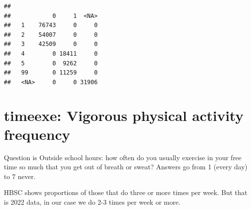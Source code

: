 \documentclass[
]{article}
\newenvironment{Shaded}{\begin{snugshade}}{\end{snugshade}}
\newcommand{\AttributeTok}[1]{\textcolor[rgb]{0.13,0.29,0.53}{#1}}
\newcommand{\DecValTok}[1]{\textcolor[rgb]{0.00,0.00,0.81}{#1}}
\newcommand{\FunctionTok}[1]{\textcolor[rgb]{0.13,0.29,0.53}{\textbf{#1}}}
\newcommand{\NormalTok}[1]{#1}
\newcommand{\OtherTok}[1]{\textcolor[rgb]{0.56,0.35,0.01}{#1}}
\newcommand{\SpecialCharTok}[1]{\textcolor[rgb]{0.81,0.36,0.00}{\textbf{#1}}}
\newcommand{\StringTok}[1]{\textcolor[rgb]{0.31,0.60,0.02}{#1}}
\begin{document}
\begin{Shaded}
\end{Shaded}

\begin{verbatim}
##       
##            0     1  <NA>
##   1    76743     0     0
##   2    54007     0     0
##   3    42509     0     0
##   4        0 18411     0
##   5        0  9262     0
##   99       0 11259     0
##   <NA>     0     0 31906
\end{verbatim}

\section{timeexe: Vigorous physical activity
frequency}\label{timeexe-vigorous-physical-activity-frequency}

Question is Outside school hours: how often do you usually exercise in
your free time so much that you get out of breath or sweat? Answers go
from 1 (every day) to 7 never.

HBSC shows proportions of those that do three or more times per week.
But that is 2022 data, in our case we do 2-3 times per week or more.
\end{document}
